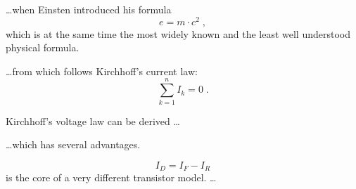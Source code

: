 \documentclass{article}
\begin{document}
\ldots when Einsten introduced his formula
\begin{equation}
 e = m \cdot c^2 \; , 
\end{equation}
which is at the same time the most widely known
and the least well understood physical formula.

\ldots from which follows Kirchhoff's current law:
\begin{equation}
 \sum_{k=1}^{n} I_k = 0 \; .
\end{equation}

Kirchhoff's voltage law can be derived \ldots

\ldots which has several advantages.

\begin{equation}
 I_D = I_F - I_R
\end{equation}
is the core of a very different transistor model. \ldots
\end{document}
